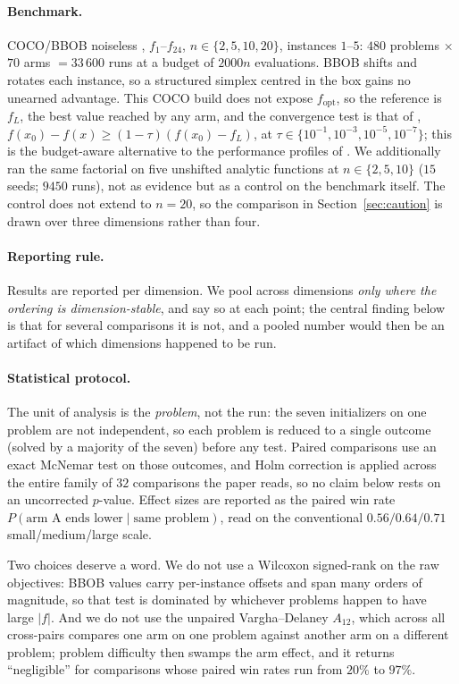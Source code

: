 \documentclass[11pt,a4paper]{article}
\begin{document}
\paragraph{Benchmark.}
COCO/BBOB noiseless \citep{hansen2021coco}, $f_1$--$f_{24}$,
$n\in\{2,5,10,20\}$, instances $1$--$5$: $480$ problems $\times$ $70$ arms
$=33\,600$ runs at a budget of $2000n$ evaluations. BBOB shifts and rotates each
instance, so a structured simplex centred in the box gains no unearned
advantage. This COCO build does not expose $f_{\mathrm{opt}}$, so the reference
is $f_L$, the best value reached by any arm, and the convergence test is that of
\citet{more2009}, $f(x_0)-f(x)\ge(1-\tau)(f(x_0)-f_L)$, at
$\tau\in\{10^{-1},10^{-3},10^{-5},10^{-7}\}$; this is the budget-aware
alternative to the performance profiles of \citet{dolan2002}. We additionally
ran the same factorial on five unshifted analytic functions at
$n\in\{2,5,10\}$ ($15$ seeds; $9450$ runs), not as evidence but as a control on
the benchmark itself. The control does not extend to $n=20$, so the comparison in
Section~\ref{sec:caution} is drawn over three dimensions rather than four.

\paragraph{Reporting rule.}
Results are reported per dimension. We pool across dimensions \emph{only where
the ordering is dimension-stable}, and say so at each point; the central finding
below is that for several comparisons it is not, and a pooled number would then
be an artifact of which dimensions happened to be run.

\paragraph{Statistical protocol.}
The unit of analysis is the \emph{problem}, not the run: the seven initializers
on one problem are not independent, so each problem is reduced to a single
outcome (solved by a majority of the seven) before any test. Paired comparisons
use an exact McNemar test on those outcomes, and Holm correction is applied
across the entire family of $32$ comparisons the paper reads, so no claim below
rests on an uncorrected $p$-value. Effect sizes are reported as the paired win
rate $P(\text{arm A ends lower}\mid\text{same problem})$, read on the
conventional $0.56/0.64/0.71$ small/medium/large scale.

Two choices deserve a word. We do not use a Wilcoxon signed-rank on the raw
objectives: BBOB values carry per-instance offsets and span many orders of
magnitude, so that test is dominated by whichever problems happen to have large
$|f|$. And we do not use the unpaired Vargha--Delaney $A_{12}$, which across all
cross-pairs compares one arm on one problem against another arm on a different
problem; problem difficulty then swamps the arm effect, and it returns
``negligible'' for comparisons whose paired win rates run from $20\%$ to $97\%$.
\end{document}

